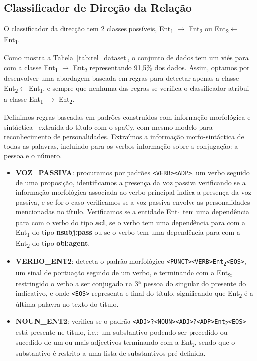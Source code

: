 \documentclass[a4paper, twocolumn, 11pt, twoside]{article}
\begin{document}
\subsection{Classificador de Direção da Relação}
\label{subsec:rel_direction}

O classificador da direcção tem 2 classes possíveis, Ent\textsubscript{1} $\rightarrow$ Ent\textsubscript{2} ou Ent\textsubscript{2}$\leftarrow$Ent\textsubscript{1}. 

Como mostra a Tabela~\ref{tab:rel_dataset}, o conjunto de dados tem um viés para com a classe Ent\textsubscript{1} $\rightarrow$ Ent\textsubscript{2} representando 91,5\% dos dados. Assim, optamos por desenvolver uma abordagem baseada em regras para detectar apenas a classe Ent\textsubscript{2}$\leftarrow$Ent\textsubscript{1}, e sempre que nenhuma das regras se verifica o classificador atribui a classe Ent\textsubscript{1} $\rightarrow$ Ent\textsubscript{2}.

Definimos regras baseadas em padrões construídos com informação morfológica e sintáctica~\citep{nivre-etal-2020-universal} extraída do título com o spaCy, com mesmo modelo  para reconhecimento de personalidades. Extraímos a informação morfo-sintáctica de todas as palavras, incluindo para os verbos informação sobre a conjugação: a pessoa e o número.

\begin{itemize}

\item \textbf{VOZ\_PASSIVA}: procuramos por padrões \texttt{<VERB><ADP>}, um verbo seguido de uma proposição, identificamos a presença da voz passiva verificando se a informação morfológica associada ao verbo principal indica a presença da voz passiva, e se for o caso verificamos se a voz passiva envolve as personalidades mencionadas no título. Verificamos se a entidade Ent\textsubscript{1} tem uma dependência para com o verbo do tipo \textbf{acl}, se o verbo tem uma dependência para com a Ent\textsubscript{1} do tipo \textbf{nsubj:pass} ou se o verbo tem uma dependência para com a Ent\textsubscript{2} do tipo \textbf{obl:agent}. 

\item \textbf{VERBO\_ENT2}: detecta o padrão morfológico \texttt{<PUNCT><VERB>Ent\textsubscript{2}<EOS>}, um sinal de pontuação seguido de um verbo, e terminando com a Ent\textsubscript{2}, restringido o verbo a ser conjugado na 3ª pessoa do singular do presente do indicativo, e onde \texttt{<EOS>} representa o final do título, significando que Ent\textsubscript{2} é a última palavra no texto do título.

\item \textbf{NOUN\_ENT2}: verifica se o padrão \texttt{<ADJ>?<NOUN><ADJ>?<ADP>Ent\textsubscript{2}<EOS>} está presente no título, i.e.: um substantivo podendo ser precedido ou sucedido de um ou mais adjectivos terminando com a Ent\textsubscript{2}, sendo que o substantivo é restrito a uma lista de substantivos pré-definida.
\end{itemize}
\end{document}
